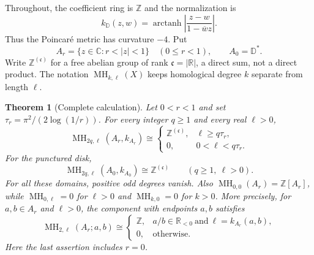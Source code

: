\documentclass[12pt]{amsart}
\newtheorem{thm}{Theorem}[section]
\theoremstyle{definition}
\theoremstyle{remark}
\numberwithin{equation}{section}
\newcommand{\R}{\mathbb{R}}
\newcommand{\Z}{\mathbb{Z}}
\newcommand{\C}{\mathbb{C}}
\newcommand{\D}{\mathbb{D}}
\DeclareMathOperator{\MH}{MH}
\begin{document}
Throughout, the coefficient ring is $\Z$ and the normalization is
\begin{equation}\label{eq:disk}
k_{\D}(z,w)=\operatorname{arctanh}\left|\frac{z-w}{1-\overline w z}\right|.
\end{equation}
Thus the Poincar\'e metric has curvature $-4$. Put
\[
 A_r=\{z\in\C:r<|z|<1\}\quad(0\le r<1),\qquad A_0=\D^*.
\]
Write $\Z^{(\mathfrak c)}$ for a free abelian group of rank $\mathfrak c=|\R|$, a direct sum, not a direct product. The notation $\MH_{k,\ell}(X)$ keeps homological degree $k$ separate from length $\ell$.

\begin{thm}[Complete calculation]\label{thm:calculation}
Let $0<r<1$ and set $\tau_r=\pi^2/(2\log(1/r))$. For every integer $q\ge1$ and every real $\ell>0$,
\begin{equation}\label{eq:annulus-homology}
 \MH_{2q,\ell}(A_r,k_{A_r})\cong
 \begin{cases}\Z^{(\mathfrak c)},&\ell\ge q\tau_r,\\0,&0<\ell<q\tau_r.\end{cases}
\end{equation}
For the punctured disk,
\begin{equation}\label{eq:cusp-homology}
 \MH_{2q,\ell}(A_0,k_{A_0})\cong\Z^{(\mathfrak c)}\qquad(q\ge1,\ \ell>0).
\end{equation}
For all these domains, positive odd degrees vanish. Also $\MH_{0,0}(A_r)=\Z[A_r]$, while $\MH_{0,\ell}=0$ for $\ell>0$ and $\MH_{k,0}=0$ for $k>0$.
More precisely, for $a,b\in A_r$ and $\ell>0$, the component with endpoints $a,b$ satisfies
\begin{equation}\label{eq:endpoint-homology}
 \MH_{2,\ell}(A_r;a,b)\cong
 \begin{cases}\Z,& a/b\in\R_{<0}\ \text{and}\ \ell=k_{A_r}(a,b),\\0,&\text{otherwise}.\end{cases}
\end{equation}
Here the last assertion includes $r=0$.
\end{thm}
\end{document}
